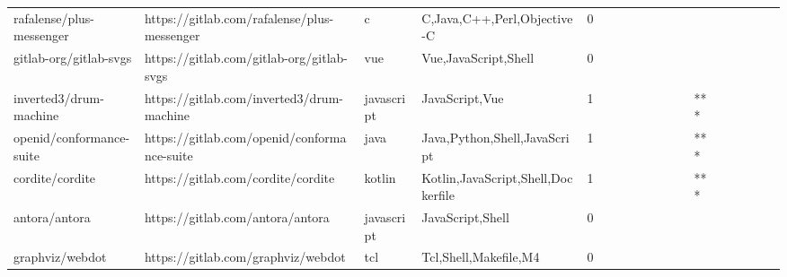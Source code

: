 \begin{tabular}{llllrlllllllllllll}
rafalense/plus-messenger                           &        https://gitlab.com/rafalense/plus-messenger &                 c &                        C,Java,C++,Perl,Objective-C &       0 &         &        &           &                &                 &        &           &           &          &          &       &              &          \\
gitlab-org/gitlab-svgs                             &          https://gitlab.com/gitlab-org/gitlab-svgs &               vue &                               Vue,JavaScript,Shell &       0 &         &        &           &                &                 &        &           &           &          &          &       &              &          \\
inverted3/drum-machine                             &          https://gitlab.com/inverted3/drum-machine &        javascript &                                     JavaScript,Vue &       1 &         &        &           &                &                 &        &           &       *** &          &          &       &              &          \\
openid/conformance-suite                           &        https://gitlab.com/openid/conformance-suite &              java &                       Java,Python,Shell,JavaScript &       1 &         &        &           &                &                 &        &           &       *** &          &          &       &              &          \\
cordite/cordite                                    &                 https://gitlab.com/cordite/cordite &            kotlin &                 Kotlin,JavaScript,Shell,Dockerfile &       1 &         &        &           &                &                 &        &           &       *** &          &          &       &              &          \\
antora/antora                                      &                   https://gitlab.com/antora/antora &        javascript &                                   JavaScript,Shell &       0 &         &        &           &                &                 &        &           &           &          &          &       &              &          \\
graphviz/webdot                                    &                 https://gitlab.com/graphviz/webdot &               tcl &                              Tcl,Shell,Makefile,M4 &       0 &         &        &           &                &                 &        &           &           &          &          &       &              &          \\

\end{tabular}
